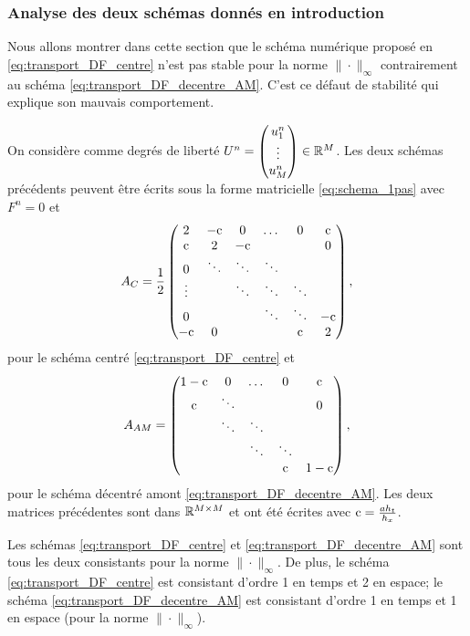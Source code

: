 \documentclass[12pt,a4paper,twoside]{article}
\begin{document}
\subsubsection{Analyse des deux sch\'emas donn\'es en introduction}


Nous allons montrer dans cette section que le sch\'ema num\'erique 
propos\'e en \eqref{eq:transport_DF_centre} n'est pas stable pour la norme $\| \cdot \|_{\infty}$
contrairement au sch\'ema \eqref{eq:transport_DF_decentre_AM}.
C'est ce d\'efaut de stabilit\'e qui explique son mauvais comportement.

On consid\`ere comme degr\'es de libert\'e
$U^n = 
\begin{pmatrix}
  u_1^n \\ \vdots \\ u_{M}^n
\end{pmatrix}
\in \mathbb{R}^M
$.
Les deux sch\'emas pr\'ec\'edents peuvent \^etre \'ecrits sous la forme matricielle 
\eqref{eq:schema_1pas} avec $F^n = 0$ et
\begin{align}
  A_{C} = \dfrac{1}{2}
  \begin{pmatrix}
    2 & -\mathrm{c} & 0 & \dots & 0 & \mathrm{c}
    \\
    \mathrm{c} & 2 & -\mathrm{c} & & & 0
    \\
    0 & \ddots & \ddots & \ddots & &
    \\
    \vdots & & \ddots & \ddots & \ddots
    \\
    0 & & & \ddots & \ddots & -\mathrm{c}
    \\
    -\mathrm{c} & 0 & & & \mathrm{c} & 2
  \end{pmatrix},
\end{align}
pour le sch\'ema centr\'e \eqref{eq:transport_DF_centre}
et
\begin{align}
  \label{eq:trans_mat_per_AM}
  A_{AM} = 
  \begin{pmatrix}
    1-\mathrm{c} & 0 & \dots & 0 & \mathrm{c}
    \\
    \mathrm{c} & \ddots & & & 0
    \\
    & \ddots & \ddots &   &
    \\
    & & \ddots & \ddots &
    \\
    &&   &  \mathrm{c} & 1-\mathrm{c}
  \end{pmatrix},
\end{align}
pour le sch\'ema d\'ecentr\'e amont \eqref{eq:transport_DF_decentre_AM}.
Les deux matrices pr\'ec\'edentes sont dans
$\mathbb{R}^{M \times M}$ et ont \'et\'e \'ecrites avec 
$\mathrm{c} = \frac{a h_t}{h_x}$.

\begin{proposition}
  \label{prop:consistance_2_schemas}
  Les sch\'emas \eqref{eq:transport_DF_centre} et \eqref{eq:transport_DF_decentre_AM}
  sont tous les deux consistants pour la norme $\| \cdot \|_{\infty}$.
  De plus, le sch\'ema \eqref{eq:transport_DF_centre} est consistant d'ordre 1
  en temps et 2 en espace;
  le sch\'ema \eqref{eq:transport_DF_decentre_AM} est consistant d'ordre 1
  en temps et 1 en espace (pour la norme $\| \cdot \|_{\infty}$).
\end{proposition}
\end{document}
